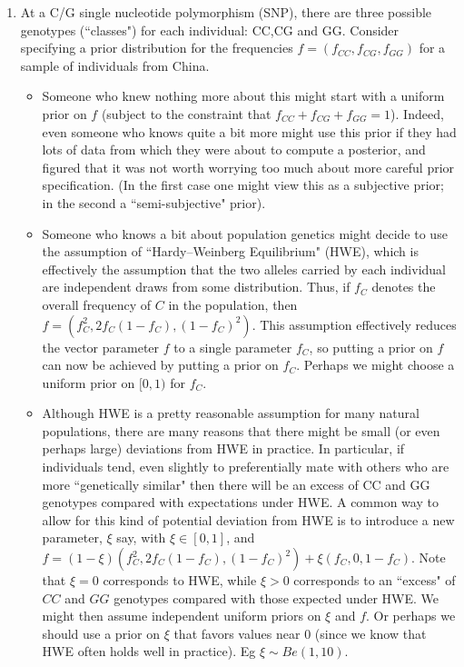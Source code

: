 \documentclass[12pt]{article}
\begin{document}
\begin{enumerate}
  \def\fvec{(f_{CC},f_{CG},f_{GG})}
  
  \item At a C/G single nucleotide polymorphism (SNP), there are three possible genotypes (``classes") for each individual: CC,CG and GG. 
 Consider specifying a prior distribution for the  frequencies $f=\fvec$ for a sample of individuals from China.
 \begin{itemize}
 \item Someone who knew nothing more about this might start with a uniform prior on $f$ (subject to the constraint that $f_{CC}+f_{CG}+f_{GG}=1$). Indeed, even someone who knows quite a bit more might use this prior if they had lots of data from which they were about to compute a posterior, and figured that it was not worth worrying too much about more careful prior specification. (In the first case one might view this as a subjective prior; in the second a ``semi-subjective" prior).
 \item Someone who knows a bit about population genetics might decide to use the assumption of ``Hardy--Weinberg Equilibrium" (HWE), which is effectively the assumption that the two alleles carried by each individual are independent draws from some distribution. Thus, if $f_C$ denotes the overall frequency of $C$ in the population, then $f=(f_C^2, 2f_C(1-f_C),(1-f_C)^2)$. This assumption effectively reduces the vector parameter $f$ to a single parameter $f_C$, so
 putting a prior on $f$ can now be achieved by putting
 a prior on $f_C$. Perhaps we might choose a uniform prior on $[0,1)$ for $f_C$.
  \item Although HWE is a pretty reasonable assumption for many natural populations, there are many reasons that there might be small (or even perhaps large)
  deviations from HWE in practice. In particular, if individuals tend, even slightly to preferentially mate with others who are more ``genetically similar" then
  there will be an excess of CC and GG genotypes compared with expectations under HWE.
   A common way to allow for this kind of potential deviation from HWE is to introduce a new parameter, $\xi$ say, with $\xi \in [0,1]$, and
 $f=(1-\xi)(f_C^2, 2f_C(1-f_C),(1-f_C)^2) + \xi(f_C,0,1-f_C)$. Note that $\xi=0$ corresponds to HWE, while $\xi>0$ corresponds to an ``excess" of $CC$ and $GG$ genotypes
 compared with those expected under HWE. We might then assume independent uniform priors on $\xi$ and $f$. Or perhaps we should use a prior
 on $\xi$ that favors values near 0 (since we know that HWE often holds well in practice). Eg $\xi \sim Be(1,10)$.    

\end{itemize}
\end{enumerate}
\end{document}
